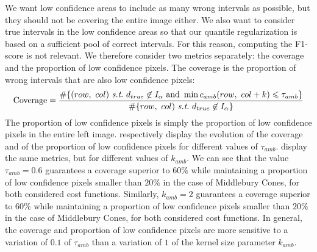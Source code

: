 We want low confidence areas to include as many wrong intervals as possible, but they should not be covering the entire image either. We also want to consider true intervals in the low confidence areas so that our quantile regularization is based on a sufficient pool of correct intervals. For this reason, computing the F1-score is not relevant. We therefore consider two metrics separately: the coverage and the proportion of low confidence pixels. The coverage is the proportion of wrong intervals that are also low confidence pixels:
\begin{align*}
    \mathrm{Coverage} = \dfrac{\#\{(\rowcol)~\st~d_{true}\not\in I_\alpha\text{ and }\min c_{amb}(\rowcol+k)\leqslant \tau_{amb} \}}{\#\{\rowcol)~\st~d_{true}\not\in I_\alpha\}}
\end{align*}
The proportion of low confidence pixels is simply the proportion of low confidence pixels in the entire left image.
 respectively display the evolution of the coverage and of the proportion of low confidence pixels for different values of $\tau_{amb}$.  display the same metrics, but for different values of $k_{amb}$. We can see that the value $\tau_{amb}=0.6$ guarantees a coverage superior to $60\%$ while maintaining a proportion of low confidence pixels smaller than $20\%$ in the case of Middlebury Cones, for both considered cost functions. Similarly, $k_{amb}=2$ guarantees a coverage superior to $60\%$ while maintaining a proportion of low confidence pixels smaller than $20\%$ in the case of Middlebury Cones, for both considered cost functions. In general, the coverage and proportion of low confidence pixels are more sensitive to a variation of $0.1$ of $\tau_{amb}$ than a variation of $1$ of the kernel size parameter $k_{amb}$.

